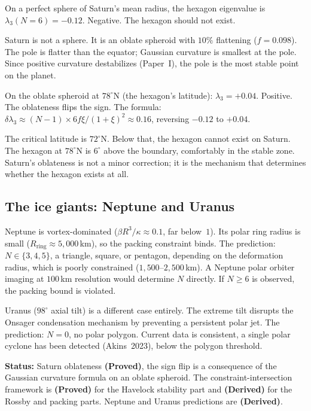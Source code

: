 On a perfect sphere of Saturn's mean radius, the hexagon
eigenvalue is $\lambda_3(N{=}6) = -0.12$.  Negative.
The hexagon should not exist.

Saturn is not a sphere.  It is an oblate spheroid with
$10\%$ flattening ($f = 0.098$).  The pole is flatter than
the equator; Gaussian curvature is smallest at the pole.
Since positive curvature destabilizes (Paper~I),
the pole is the most stable point on the planet.

On the oblate spheroid at $78^\circ$N (the hexagon's latitude):
$\lambda_3 = +0.04$.  Positive.  The oblateness flips
the sign.  The formula:
$\delta\lambda_3 \approx (N{-}1) \times 6 f\xi/(1{+}\xi)^2
\approx 0.16$, reversing $-0.12$ to $+0.04$.

The critical latitude is $72^\circ$N.  Below that, the hexagon
cannot exist on Saturn.  The hexagon at $78^\circ$N is $6^\circ$
above the boundary, comfortably in the stable zone.
Saturn's oblateness is not a minor correction; it is the
mechanism that determines whether the hexagon exists at all.

\subsection*{The ice giants: Neptune and Uranus}

Neptune is vortex-dominated ($\beta R^3/\kappa \approx 0.1$,
far below~$1$).  Its polar ring radius is small
($R_{\mathrm{ring}} \approx 5{,}000$\,km), so the packing
constraint binds.  The prediction: $N \in \{3, 4, 5\}$, a
triangle, square, or pentagon, depending on the deformation
radius, which is poorly constrained ($1{,}500$--$2{,}500$\,km).
A Neptune polar orbiter imaging at $100$\,km resolution
would determine $N$ directly.  If $N \ge 6$ is observed,
the packing bound is violated.

Uranus ($98^\circ$ axial tilt) is a different case entirely.
The extreme tilt disrupts the Onsager condensation mechanism
by preventing a persistent polar jet.  The prediction: $N = 0$,
no polar polygon.  Current data is consistent, a single
polar cyclone has been detected (Akins~2023), below the
polygon threshold.

\textbf{Status:} Saturn oblateness \textbf{(Proved)}, the
sign flip is a consequence of the Gaussian curvature formula
on an oblate spheroid.  The constraint-intersection framework
is \textbf{(Proved)} for the Havelock stability part
and \textbf{(Derived)} for the Rossby and packing parts.
Neptune and Uranus predictions are \textbf{(Derived)}.


